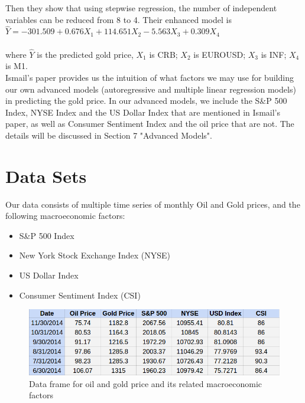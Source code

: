 \documentclass[runningheads]{llncs}
\begin{document}
\noindent Then they show that using stepwise regression, the number of independent variables can be reduced from 8 to 4. Their enhanced model is  \\

$\hat{Y}=-301.509+0.676X_1+114.651X_2-5.563X_3+0.309X_4$ \\\\
where $\hat{Y}$ is the predicted gold price, $X_1$ is CRB; $X_2$ is EUROUSD; $X_3$ is INF; $X_4$ is M1. \\

\noindent Ismail's paper provides us the intuition of what factors we may use for building our own advanced models (autoregressive and multiple linear regression models) in predicting the gold price. In our advanced models, we include the S\&P 500 Index, NYSE Index and the US Dollar Index that are mentioned in Ismail's paper, as well as Consumer Sentiment Index and the oil price that are not. The details will be discussed in Section 7 "Advanced Models".


\section{Data Sets}
Our data consists of multiple time series of monthly Oil and Gold prices\cite{quandal}, and the following macroeconomic factors:

\begin {itemize}
\item S\&P 500 Index \cite{quandal}
\item New York Stock Exchange Index (NYSE) \cite{quandal}
\item US Dollar Index \cite{quandal}
\item Consumer Sentiment Index (CSI) \cite{csi}
\end {itemize}

\begin{figure}
\centering
\includegraphics[width=\textwidth]{DataMatrices.png}
\caption{Data frame for oil and gold price and its related macroeconomic factors}
\label{fig:DataMatrices.png}
\end{figure}
\end{document}
